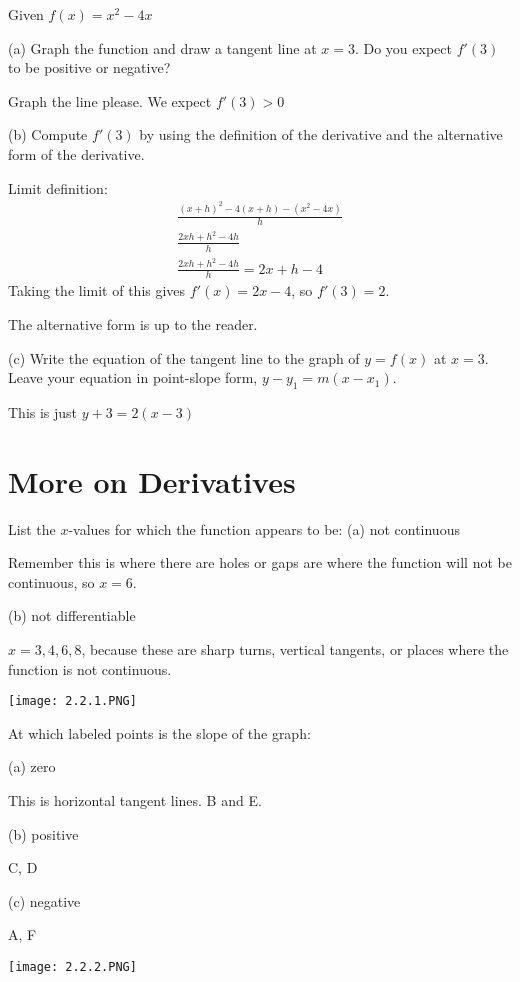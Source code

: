 \documentclass[../bccalc.tex]{subfiles}
\begin{document}
\begin{example}
    Given $f(x)=x^2-4x$

    (a) Graph the function and draw a tangent line at $x=3$. Do you expect $f'(3)$ to be positive or negative?

    Graph the line please. We expect $f'(3)>0$

    (b) Compute $f'(3)$ by using the definition of the derivative and the alternative form of the derivative.

    Limit definition: 
    \begin{align*}
        \frac{(x+h)^2-4(x+h)-(x^2-4x)}{h} \\
        \frac{2xh+h^2-4h}{h}\\
        \frac{2xh+h^2-4h}{h} = 2x+h-4
    \end{align*}
    Taking the limit of this gives $f'(x)=2x-4$, so $f'(3)=2$.

    The alternative form is up to the reader.

    (c) Write the equation of the tangent line to the graph of $y=f(x)$ at $x=3$. Leave your equation in point-slope form, $y-y_1=m(x-x_1)$.

    This is just $y+3=2(x-3)$
\end{example}

\section{More on Derivatives}
\begin{example}
    List the $x$-values for which the function appears to be:
    (a) not continuous 

    Remember this is where there are holes or gaps are where the function will not be continuous, so $x=6$.

    (b) not differentiable 

    $x=3,4,6,8$, because these are sharp turns, vertical tangents, or places where the function is not continuous.
    \begin{center}
        \texttt{[image: 2.2.1.PNG]}
    \end{center}
\end{example}

\begin{example}
    At which labeled points is the slope of the graph:

    (a) zero 

    This is horizontal tangent lines. B and E.

    (b) positive 

    C, D

    (c) negative 

    A, F

    \begin{center}
        \texttt{[image: 2.2.2.PNG]}
    \end{center}
\end{example}
\end{document}
